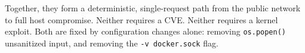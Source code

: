 Together, they form a deterministic, single-request path from the public network to full host compromise. Neither requires a CVE. Neither requires a kernel exploit. Both are fixed by configuration changes alone: removing \texttt{os.popen()} unsanitized input, and removing the \texttt{-v docker.sock} flag.

\vspace{0.5cm}
